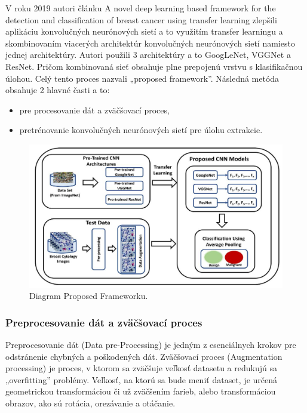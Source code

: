 \hspace{10mm}V roku 2019 autori článku A novel deep learning based framework for the detection and classification of breast cancer using transfer learning zlepšili aplikáciu  konvolučných neurónových sietí a to využitím transfer learningu a skombinovaním viacerých architektúr konvolučných neurónových sietí namiesto jednej architektúry. Autori použili 3 architektúry a to GoogLeNet, VGGNet a ResNet. Pričom kombinovaná sieť obsahuje plne prepojenú vrstvu s klasifikačnou úlohou. Celý tento proces nazvali „proposed framework”. Následná metóda obsahuje 2 hlavné časti a to:
\begin{itemize}
    \item pre procesovanie dát a zväčšovací proces,
    \item pretrénovanie konvolučných neurónových sietí pre úlohu extrakcie.
\end{itemize}

\begin{figure}[h]
\begin{centering}
\includegraphics[width=12cm]{assets/images/251_1.JPG}
\par\end{centering}
\caption{Diagram Proposed Frameworku. \label{fig:dynabook}\cite{KHAN20191}}
\end{figure}

\subsubsection*{Preprocesovanie dát a zväčšovací proces}
\hspace{10mm}Preprocesovanie dát (Data pre-Processing) je jedným z esenciálnych krokov pre odstránenie chybných a poškodených dát. Zväčšovací proces (Augmentation processing)  je proces, v ktorom sa zväčšuje veľkosť datasetu a redukujú sa „overfitting” problémy. Veľkosť, na ktorú sa bude meniť dataset, je určená geometrickou transformáciou či už zväčšením farieb, alebo transformáciou obrazov, ako sú rotácia, orezávanie a otáčanie.

